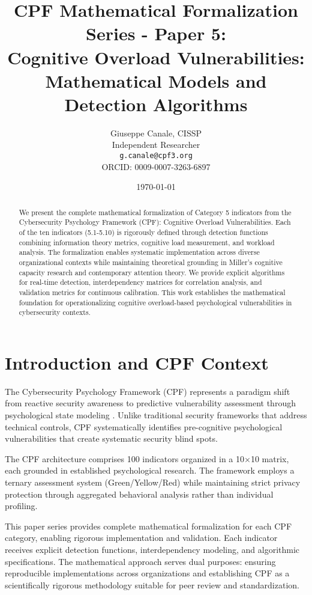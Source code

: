 \documentclass[11pt,a4paper]{article}
\title{CPF Mathematical Formalization Series - Paper 5:\\Cognitive Overload Vulnerabilities: Mathematical Models and Detection Algorithms}
\author{
    Giuseppe Canale, CISSP\\
    Independent Researcher\\
    \texttt{g.canale@cpf3.org}\\
    ORCID: 0009-0007-3263-6897
}
\date{\today}
\begin{document}
\maketitle

\begin{abstract}
We present the complete mathematical formalization of Category 5 indicators from the Cybersecurity Psychology Framework (CPF): Cognitive Overload Vulnerabilities. Each of the ten indicators (5.1-5.10) is rigorously defined through detection functions combining information theory metrics, cognitive load measurement, and workload analysis. The formalization enables systematic implementation across diverse organizational contexts while maintaining theoretical grounding in Miller's cognitive capacity research and contemporary attention theory. We provide explicit algorithms for real-time detection, interdependency matrices for correlation analysis, and validation metrics for continuous calibration. This work establishes the mathematical foundation for operationalizing cognitive overload-based psychological vulnerabilities in cybersecurity contexts.
\end{abstract}

\section{Introduction and CPF Context}

The Cybersecurity Psychology Framework (CPF) represents a paradigm shift from reactive security awareness to predictive vulnerability assessment through psychological state modeling \cite{canale2024cpf}. Unlike traditional security frameworks that address technical controls, CPF systematically identifies pre-cognitive psychological vulnerabilities that create systematic security blind spots.

The CPF architecture comprises 100 indicators organized in a 10×10 matrix, each grounded in established psychological research. The framework employs a ternary assessment system (Green/Yellow/Red) while maintaining strict privacy protection through aggregated behavioral analysis rather than individual profiling.

This paper series provides complete mathematical formalization for each CPF category, enabling rigorous implementation and validation. Each indicator receives explicit detection functions, interdependency modeling, and algorithmic specifications. The mathematical approach serves dual purposes: ensuring reproducible implementations across organizations and establishing CPF as a scientifically rigorous methodology suitable for peer review and standardization.
\end{document}
